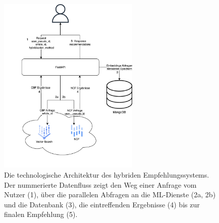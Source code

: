 \begin{figure}[H]
    \centering
    \includegraphics[width=0.6\textwidth]{content/figures/svg/architektur.pdf}
    \caption{Die technologische Architektur des hybriden Empfehlungssystems. Der nummerierte Datenfluss zeigt den Weg einer Anfrage vom Nutzer (1), 
    über die parallelen Abfragen an die ML-Dienste (2a, 2b) und die Datenbank (3), die eintreffenden Ergebnisse (4) bis zur finalen Empfehlung (5).}
    \label{fig:architektur}
\end{figure}